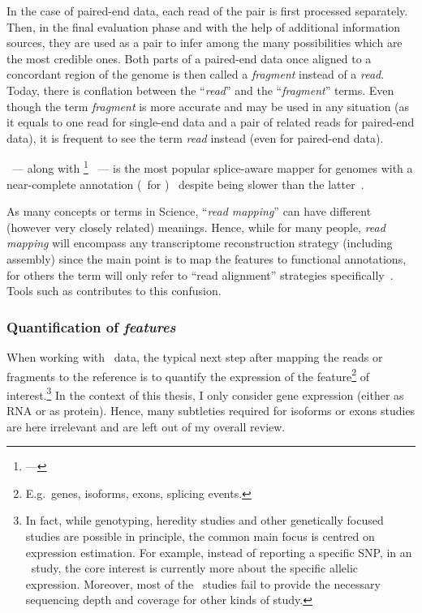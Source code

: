 In the case of paired-end data,
each read of the pair is first processed separately.
Then, in the final evaluation phase and
with the help of additional information sources,
they are used as a pair to infer among the many possibilities which
are the most credible ones.
Both parts of a paired-end data once aligned to a
concordant region of the genome is then called a \emph{fragment} instead of a
\emph{read}. Today, there is conflation between the \enquote{\emph{read}}
and the \enquote{\emph{fragment}} terms. Even though the term \emph{fragment}
is more accurate and may be used in any situation (as it equals to one read for
single-end data and a pair of related reads for paired-end data), it is
frequent to see the term \emph{read} instead (even for paired-end data).\mybr\

\toph\ ---
along with \footnote{ ---
}~ ---
is the most popular splice-aware mapper for genomes with a near-complete annotation
(\eg\ for )~
despite being slower than the latter~.\mybr\

As many concepts or terms in Science, \enquote{\emph{read mapping}} can
have different (however very closely related) meanings.
Hence, while for many people, \emph{read mapping} will encompass any
transcriptome reconstruction strategy (including  assembly) since
the main point is to map the features to functional annotations,
for others the term will only refer to
\enquote{read alignment} strategies specifically~.
Tools such as  contributes to this confusion.\mybr\

\subsubsection{Quantification of \emph{features}}\label{subsubsec:rnaseqQuant}

When working with \Rnaseq\ data, the typical next step after mapping the reads or
fragments to the reference is to quantify the expression of the
feature\footnote{E.g.\ genes, isoforms, exons, splicing events.}
of interest.\footnote{In fact, while genotyping, heredity
studies and other genetically focused studies are possible in principle, the common
main focus is centred on expression estimation. For example, instead of
reporting a specific \gls{SNP}, in an \Rnaseq\ study, the core interest is
currently more about the specific allelic expression. Moreover, most of the \Rnaseq\
studies fail to provide the necessary sequencing depth and coverage for other kinds of study.}
In the context of this thesis, I only consider gene expression (either as \gls{RNA}
or as protein). Hence, many subtleties required for isoforms or exons studies are
here irrelevant and are left out of my overall review.\mybr\

